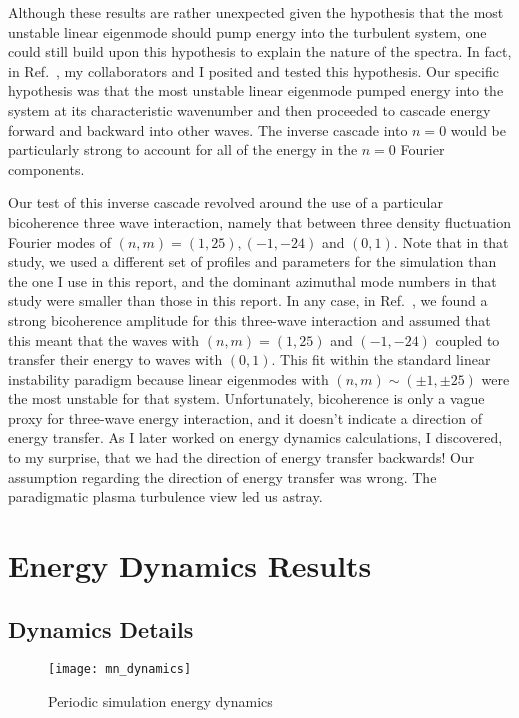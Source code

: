 Although these results are rather unexpected given the hypothesis that the most unstable linear eigenmode should pump energy into the turbulent system, one could still build upon this
hypothesis to explain the nature of the spectra. 
In fact, in Ref.~\cite{Umansky2011}, my collaborators and I posited and tested this hypothesis. Our specific hypothesis was that the most unstable linear eigenmode pumped energy into the system at
its characteristic wavenumber and then proceeded to cascade energy forward and backward into other waves. The inverse cascade into $n=0$ would be particularly strong to account for all of
the energy in the $n=0$ Fourier components.

Our test of this inverse cascade revolved around the use of a particular bicoherence three wave interaction, namely that between
three density fluctuation Fourier modes of $(n,m)=(1,25),(-1,-24)$ and $(0,1)$. Note that in that study, we used a different set of profiles and parameters for the simulation 
than the one I use in this report, and the dominant azimuthal mode numbers in that study were smaller than those in this report.
In any case, in Ref.~\cite{Umansky2011}, we found a strong bicoherence amplitude for this three-wave interaction
and assumed that this meant that the waves with $(n,m)=(1,25)$ and $(-1,-24)$ coupled to transfer their energy
to waves with $(0,1)$. This fit within the standard linear instability paradigm because linear eigenmodes with $(n,m) \sim (\pm 1, \pm 25)$ were the most unstable for that system.
Unfortunately, bicoherence is only a vague proxy for three-wave energy interaction, and it doesn't indicate a direction of energy transfer. 
As I later worked on energy dynamics calculations, I discovered, to my surprise, that we had the direction of energy transfer backwards! 
Our assumption regarding the direction of energy transfer was wrong. The paradigmatic plasma turbulence view led us astray.


\section{Energy Dynamics Results}
\label{s_per_en_dyn}

\subsection{Dynamics Details}
\label{ss_dyn_details}


\begin{figure}[!ht]
\centerline{\texttt{[image: mn\_dynamics]}}
\caption{Periodic simulation energy dynamics}
\label{mn_dynamics}
\end{figure}


